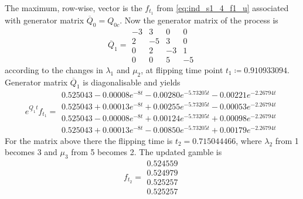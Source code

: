 \documentclass{article}
\begin{document}
The maximum, row-wise, vector is the $f_{t_1}$ from \eqref{eq:ind_s1_4_f1_u} associated with generator matrix $\overline{Q}_{0}=Q_{0c}$.
Now the generator matrix of the process is
\begin{equation*} 
 \overline{Q}_{1}= 
 \begin{array}{|rrrr|}
  -3 & 3 & 0 & 0 \\
  2 & -5 & 3 & 0 \\
  0 & 2 & -3 & 1 \\
  0 & 0 & 5 & -5 
 \end{array}
 \end{equation*}
according to the changes in $\lambda_{1}$ and $\mu_{2}$, at flipping time point $t_{1}\coloneqq 0.910933094$.
Generator matrix $\overline{Q}_1$ is diagonalisable and yields 
\begin{equation*} 
 e^{\underline{Q}_{1}t}f_{t_1}= 
 \begin{array}{|r|}
 0.525043-0.00008e^{-8t}-0.00280e^{-5.73205t}-0.00221e^{-2.26794t}\\
 0.525043+0.00013e^{-8t}+0.00255e^{-5.73205t}-0.00053e^{-2.26794t}\\
 0.525043-0.00008e^{-8t}+0.00124e^{-5.73205t}+0.00098e^{-2.26794t}\\
 0.525043+0.00013e^{-8t}-0.00850e^{-5.73205t}+0.00179e^{-2.26794t}  
 \end{array}
 \end{equation*}
For the matrix above there the flipping time is $t_{2}=0.715044466$, where $\lambda_{2}$ from 1 becomes 3 and $\mu_{3}$ from 5 becomes 2.
The updated gamble is
\begin{equation*} 
 f_{t_2}= 
 \begin{array}{|c|}
  0.524559\\
  0.524979\\
  0.525257\\
  0.525257  
 \end{array}
 \end{equation*}
\\\\
\end{document}
